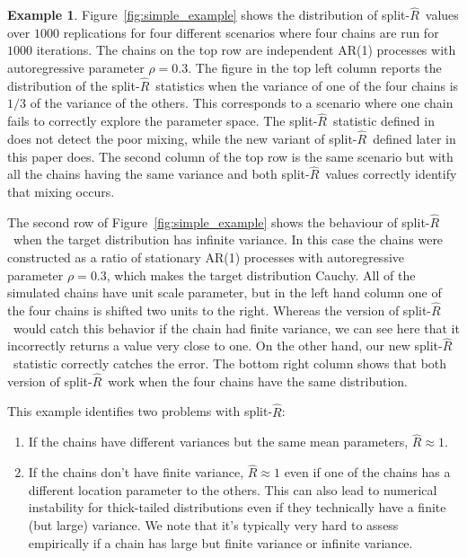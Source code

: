 \documentclass[american,]{article}
\newcommand{\sRhat}{split-$\widehat{R}$}
\theoremstyle{definition}
\newtheorem{example}{Example}
\begin{document}
\medskip
\begin{example}
Figure~\ref{fig:simple_example} shows the distribution of \sRhat\  values over $1000$ replications for four different scenarios where four chains are run for $1000$ iterations. The chains on the top row are independent AR(1) processes with autoregressive parameter $\rho=0.3$. The figure in the top left column reports the distribution of the \sRhat\ statistics  when the variance of one of the four chains is $1/3$ of the variance of the others. This corresponds to a scenario where one chain fails to correctly explore the parameter space. The \sRhat\ statistic defined in \citet{BDA3}  does not detect the poor mixing, while the new variant of \sRhat\ defined later in this paper does. The second column of the top row is the same scenario but with all the chains having the same variance and both \sRhat\ values correctly identify that mixing occurs.

The second row of Figure~\ref{fig:simple_example} shows the behaviour of \sRhat\ when the target distribution has infinite variance. In this case the chains were constructed as a ratio of stationary AR(1) processes with autoregressive parameter  $\rho=0.3$, which makes the target distribution Cauchy.  All of the simulated chains have  unit scale parameter, but in the left hand column one of the four chains is shifted two  units to the right.  Whereas the \citet{BDA3} version of \sRhat\ would catch this behavior if the chain had finite variance, we can see here that it incorrectly returns a value very close to one. On the other hand, our new \sRhat\ statistic correctly catches the error. The bottom right column shows that both version of \sRhat\ work when the four chains have the same distribution. 
\end{example}

This example identifies two problems with \sRhat : 
\begin{enumerate}
\item If the chains have different variances but the same mean parameters, $\widehat{R} \approx 1$.
\item If the chains don't have finite variance, $\widehat{R} \approx 1$ even if one of the chains has a different location parameter to the others. This can also lead to numerical instability for thick-tailed distributions even if they technically have a finite (but large) variance. We note that it's typically very hard to assess empirically
if a chain has large but finite variance or infinite variance.
\end{enumerate}
\end{document}
